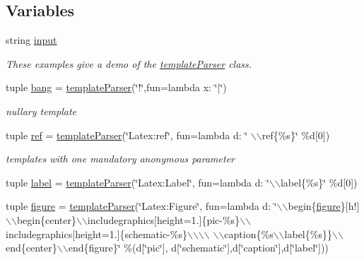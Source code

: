 \subsection*{\-Variables}
\begin{DoxyCompactItemize}
\item 
string \hyperlink{namespaceuicilibris_1_1templateParser_a934a014ef49ba892753e6d54dbeb35f3}{input}
\begin{DoxyCompactList}\small\item\em \-These examples give a demo of the \hyperlink{classuicilibris_1_1templateParser_1_1templateParser}{template\-Parser} class. \end{DoxyCompactList}\item 
tuple \hyperlink{namespaceuicilibris_1_1templateParser_ae1c46ccd8cb106ed098a453a34c6485c}{bang} = \hyperlink{classuicilibris_1_1templateParser_1_1templateParser}{template\-Parser}(\char`\"{}!\char`\"{},fun=lambda x\-: \char`\"{}$|$\char`\"{})
\begin{DoxyCompactList}\small\item\em nullary template \end{DoxyCompactList}\item 
tuple \hyperlink{namespaceuicilibris_1_1templateParser_ad641a7d51cf16935ac4a7912f8cca790}{ref} = \hyperlink{classuicilibris_1_1templateParser_1_1templateParser}{template\-Parser}(\char`\"{}\-Latex\-:ref\char`\"{}, fun=lambda d\-: \char`\"{} $\backslash$$\backslash$ref\{\%s\}\char`\"{} \%d\mbox{[}0\mbox{]})
\begin{DoxyCompactList}\small\item\em templates with one mandatory anonymous parameter \end{DoxyCompactList}\item 
tuple \hyperlink{namespaceuicilibris_1_1templateParser_acb433717f6e1666289157d06c74bb9bc}{label} = \hyperlink{classuicilibris_1_1templateParser_1_1templateParser}{template\-Parser}(\char`\"{}\-Latex\-:\-Label\char`\"{}, fun=lambda d\-: \char`\"{}$\backslash$$\backslash$label\{\%s\}\char`\"{} \%d\mbox{[}0\mbox{]})
\item 
tuple \hyperlink{namespaceuicilibris_1_1templateParser_ab62a7d06d49e36920493eedea1e78799}{figure} = \hyperlink{classuicilibris_1_1templateParser_1_1templateParser}{template\-Parser}(\char`\"{}\-Latex\-:\-Figure\char`\"{}, fun=lambda d\-: \char`\"{}$\backslash$$\backslash$begin\{\hyperlink{namespaceuicilibris_1_1templateParser_ab62a7d06d49e36920493eedea1e78799}{figure}\}\mbox{[}h!\mbox{]}$\backslash$$\backslash$begin\{center\}$\backslash$$\backslash$includegraphics\mbox{[}height=1.\-5cm\mbox{]}\{pic-\/\%s\}$\backslash$$\backslash$includegraphics\mbox{[}height=1.\-5cm\mbox{]}\{schematic-\/\%s\}$\backslash$$\backslash$$\backslash$$\backslash$ $\backslash$$\backslash$caption\{\%s$\backslash$$\backslash$label\{\%s\}\}$\backslash$$\backslash$end\{center\}$\backslash$$\backslash$end\{figure\}\char`\"{} \%(d\mbox{[}\char`\"{}pic\char`\"{}\mbox{]}, d\mbox{[}\char`\"{}schematic\char`\"{}\mbox{]},d\mbox{[}\char`\"{}caption\char`\"{}\mbox{]},d\mbox{[}\char`\"{}label\char`\"{}\mbox{]}))
$$
\end{DoxyCompactItemize}
